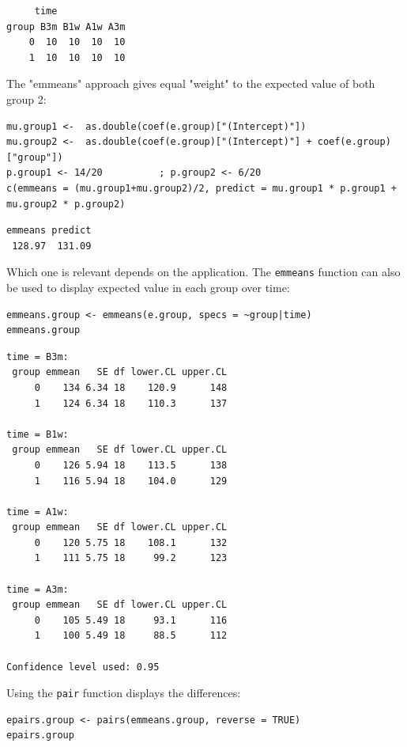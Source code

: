 \documentclass[12pt]{article}
\begin{document}
\begin{verbatim}
     time
group B3m B1w A1w A3m
    0  10  10  10  10
    1  10  10  10  10
\end{verbatim}


The "emmeans" approach gives equal "weight" to the expected value of
both group 2:
\lstset{language=r,label= ,caption= ,captionpos=b,numbers=none}
\begin{lstlisting}
mu.group1 <-  as.double(coef(e.group)["(Intercept)"])
mu.group2 <-  as.double(coef(e.group)["(Intercept)"] + coef(e.group)["group"])
p.group1 <- 14/20          ; p.group2 <- 6/20
c(emmeans = (mu.group1+mu.group2)/2, predict = mu.group1 * p.group1 + mu.group2 * p.group2)
\end{lstlisting}

\begin{verbatim}
emmeans predict 
 128.97  131.09
\end{verbatim}


Which one is relevant depends on the application. The \texttt{emmeans}
function can also be used to display expected value in each group over
time:
\lstset{language=r,label= ,caption= ,captionpos=b,numbers=none}
\begin{lstlisting}
emmeans.group <- emmeans(e.group, specs = ~group|time)
emmeans.group
\end{lstlisting}

\begin{verbatim}
time = B3m:
 group emmean   SE df lower.CL upper.CL
     0    134 6.34 18    120.9      148
     1    124 6.34 18    110.3      137

time = B1w:
 group emmean   SE df lower.CL upper.CL
     0    126 5.94 18    113.5      138
     1    116 5.94 18    104.0      129

time = A1w:
 group emmean   SE df lower.CL upper.CL
     0    120 5.75 18    108.1      132
     1    111 5.75 18     99.2      123

time = A3m:
 group emmean   SE df lower.CL upper.CL
     0    105 5.49 18     93.1      116
     1    100 5.49 18     88.5      112

Confidence level used: 0.95
\end{verbatim}

Using the \texttt{pair} function displays the differences:
\lstset{language=r,label= ,caption= ,captionpos=b,numbers=none}
\begin{lstlisting}
epairs.group <- pairs(emmeans.group, reverse = TRUE)
epairs.group
\end{lstlisting}
\end{document}
